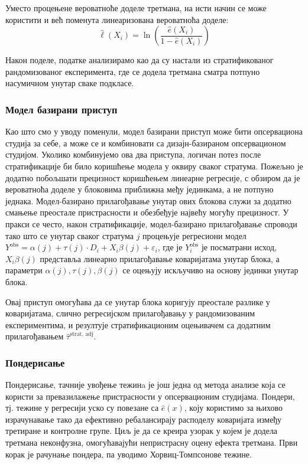 \documentclass[12pt, a4paper]{article}
\begin{document}
Уместо процењене вероватноће доделе третмана, на исти начин се може користити и већ поменута линеаризована вероватноћа доделе:
$$\hat\ell(X_i) = \ln \left( \frac{\hat{e}(X_i)}{1 - \hat{e}(X_i)} \right)$$

Након поделе, податке анализирамо као да су настали из стратификованог рандомизованог експеримента, где се додела третмана сматра потпуно насумичном унутар сваке подкласе.

\subsubsection{Модел базирани приступ}
Као што смо у уводу поменули, модел базирани приступ може бити опсервациона студија за себе, а може се и комбиновати са дизајн-базираном опсервационом студијом. Уколико комбинујемо ова два приступа, логичан потез после стратификације би било коришћење модела у оквиру сваког стратума. Пожељно је додатно побољшати прецизност коришћењем линеарне регресије, с обзиром да је вероватноћа доделе у блоковима приближна међу јединкама, а не потпуно једнака.  Модел-базирано прилагођавање унутар ових блокова служи за додатно смањење преостале пристрасности и обезбеђује највећу могућу прецизност.  У пракси се често, након стратификације, модел-базирано прилагођавање спроводи тако што се унутар сваког стратума $j$ процењује регресиони модел $Y^{\text{obs}} = \alpha(j) + \tau(j) \cdot D_i + X_i \beta(j) + \varepsilon_i$,  где је $Y_i^{\text{obs}}$ је посматрани исход, $X_i\beta(j)$ представља линеарно прилагођавање коваријатама унутар блока, а параметри $\alpha(j), \tau(j), \beta(j)$ се оцењују искључиво на основу јединки унутар блока.

Овај приступ омогућава да се унутар блока коригују преостале разлике у коваријатама, слично регресијском прилагођавању у рандомизованим експериментима, и резултује стратификационим оцењивачем са додатним прилагођавањем $\hat{\tau}^{\text{strat, adj}}$.
\subsubsection{Пондерисање}
\par Пондерисање, тачније увођење тежинa је још једна од метода анализе која се користи за превазилажење пристрасности у опсервационим студијама. Пондери, тј. тежине у регресији уско су повезане са $\hat{e}(x)$, коју користимо за њихово израчунавање тако да ефективно ребалансирају расподелу коваријата између третиране и контролне групе. Циљ је да се креира узорак у којем је додела третмана неконфузна, омогућавајући непристрасну оцену ефекта третмана.
Први корак је рачунање пондера, па уводимо Хорвиц-Томпсонове тежине. 
\end{document}
